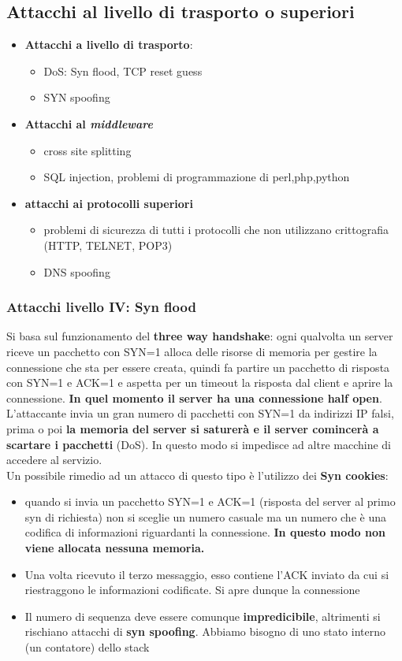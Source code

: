 \documentclass[12pt]{article}
\begin{document}
		\subsection{Attacchi al livello di trasporto o superiori}
			\begin{itemize}
				\item\textbf{ Attacchi a livello di trasporto}:
				\begin{itemize}
					\item DoS: Syn flood, TCP reset guess
					\item SYN spoofing
				\end{itemize}
				\item \textbf{Attacchi al \textit{middleware}}
				\begin{itemize}
					\item cross site splitting
					\item SQL injection, problemi di programmazione di perl,php,python
				\end{itemize}
				\item \textbf{attacchi ai protocolli superiori}
				\begin{itemize}
					\item problemi di sicurezza di tutti i protocolli che non utilizzano crittografia (HTTP, TELNET, POP3)
					\item DNS spoofing
				\end{itemize}
			\end{itemize}	
			\subsubsection{Attacchi livello IV: Syn flood}
				Si basa sul funzionamento del \textbf{three way handshake}: ogni qualvolta un server riceve un pacchetto con SYN=1 alloca delle risorse di memoria per gestire la connessione che sta per essere creata, quindi fa partire un pacchetto di risposta con SYN=1 e ACK=1 e aspetta per un timeout la risposta dal client e aprire la connessione. \textbf{In quel momento il server ha una connessione half open}. L'attaccante invia un gran numero di pacchetti con SYN=1 da indirizzi IP falsi, prima o poi \textbf{la memoria del server si saturerà e il server comincerà a scartare i pacchetti} (DoS). In questo modo si impedisce ad altre macchine di accedere al servizio.\\
				Un possibile rimedio ad un attacco di questo tipo è l'utilizzo dei \textbf{Syn cookies}:
				\begin{itemize}
					\item quando si invia un pacchetto SYN=1 e ACK=1 (risposta del server al primo syn di richiesta) non si sceglie un numero casuale ma un numero che è una codifica di informazioni riguardanti la connessione. \textbf{In questo modo non viene allocata nessuna memoria.}
					\item Una volta ricevuto il terzo messaggio, esso contiene l'ACK inviato da cui si riestraggono le informazioni codificate. Si apre dunque la connessione
					\item Il numero di sequenza deve essere comunque \textbf{impredicibile}, altrimenti si rischiano attacchi di \textbf{syn spoofing}. Abbiamo bisogno di uno stato interno (un contatore) dello stack 
				\end{itemize}
\end{document}
